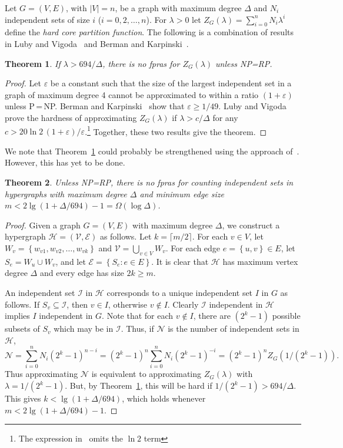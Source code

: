 \documentclass[11pt]{article}
\newtheorem{thm}{Theorem}[section]
\theoremstyle{definition}
\theoremstyle{remark}
\newcommand{\set}[1]{\left\{#1\right\}}
\newcommand{\eps}{\varepsilon}
\newcommand{\CE}{\mathcal{E}}
\newcommand{\CH}{\mathcal{H}}
\newcommand{\CI}{\mathcal{I}}
\newcommand{\CN}{\mathcal{N}}
\newcommand{\CV}{\mathcal{V}}
\begin{document}
Let $G=(V,E)$, with $|V|=n$, be a graph with maximum degree
$\Delta$ and $N_i$ independent sets of size $i$
($i=0,2,\ldots,n$). For $\lambda>0$ let $Z_G(\lambda)=\sum_{i=0}^n
N_i \lambda^i$ define the \emph{hard core partition function}. The
following is a combination of results in Luby and
Vigoda~\cite{LV99} and Berman and Karpinski~\cite{BK03}.
\begin{thm}\label{h-thm20}
If $\lambda > 694/\Delta$, there is no \emph{fpras} for
$Z_G(\lambda)$ unless NP\/=\/RP.
\end{thm}
\begin{proof}
Let $\eps$ be a constant such that the size of the largest
independent set in a graph of maximum degree 4 cannot be
approximated to within a ratio $(1+\eps)$ unless P\,=\,NP. Berman
and Karpinski~\cite{BK03} show that $\eps\geq 1/49$. Luby and
Vigoda~\cite[Theorem~4]{LV99} prove the hardness of approximating
$Z_G(\lambda)$ if $\lambda > c/\Delta$ for any $c > 20\ln
2\,(1+\eps)/\eps$.\footnote{The expression in~\cite{LV99} omits
the $\ln 2$ term} Together, these two results give the theorem.
\end{proof}
We note that Theorem~\ref{h-thm20} could probably be strengthened using the
approach of~\cite{DFJ99}. However, this has yet to be done.
\begin{thm}\label{h-thm30}
Unless NP\/=\/RP, there is no \emph{fpras} for counting
independent sets in hypergraphs with maximum degree $\Delta$ and
minimum edge size $m< 2\lg(1+\Delta/694)-1=\Omega(\log\Delta)$.
\end{thm}
\begin{proof}
Given a graph $G=(V,E)$ with maximum degree $\Delta$, we construct
a hypergraph $\CH=(\CV,\CE)$ as follows. Let $k=\lceil m/2\rceil$.
For each $v\in V$, let $W_v=\set{w_{v1},w_{v2},\ldots,w_{vk}}$ and
$\CV=\bigcup_{v\in V} W_v$. For each edge $e=\set{u,v}\in E$, let
$S_e=W_u\cup W_v$, and let $\CE=\set{S_e:e\in E}$. It is clear
that $\CH$ has maximum vertex degree $\Delta$ and every edge has
size $2k\geq m$.

An independent set $\CI$ in $\CH$ corresponds to a unique
independent set $I$ in $G$ as follows. If $S_v\subseteq \CI$, then
$v\in I$, otherwise $v\notin I$. Clearly $\CI$ independent in
$\CH$ implies $I$ independent in $G$. Note that for each $v\notin
I$, there are $(2^k-1)$ possible subsets of $S_v$ which may be in
$\CI$. Thus, if $\CN$ is the number of independent sets in $\CH$,
\begin{equation*}%
    \CN=\sum_{i=0}^n N_i(2^k-1)^{n-i}= (2^k-1)^n \sum_{i=0}^n N_i(2^k-1)^{-i}
    =(2^k-1)^n Z_G(1/(2^k-1)).
\end{equation*}
Thus approximating $\CN$ is equivalent to approximating
$Z_G(\lambda)$ with $\lambda=1/(2^k-1)$. But, by
Theorem~\ref{h-thm20}, this will be hard if $1/(2^k-1)>694/\Delta$.
This gives $k<\lg(1+\Delta/694)$, which holds whenever
$m<2\lg(1+\Delta/694)-1$.
\end{proof}
\end{document}
